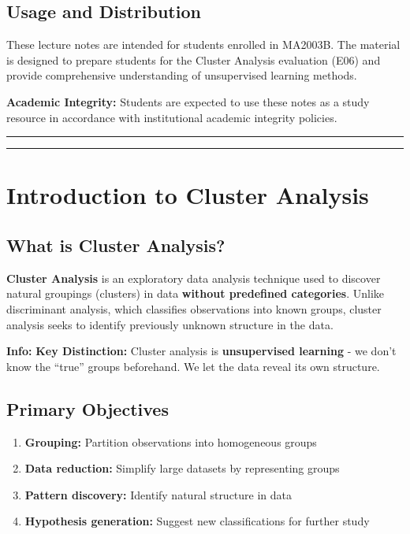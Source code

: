 \documentclass[
]{article}
\begin{document}
\textbf{ }

\subsection{Usage and Distribution}

These lecture notes are intended for students enrolled in MA2003B. The
material is designed to prepare students for the Cluster Analysis
evaluation (E06) and provide comprehensive understanding of unsupervised
learning methods.

\textbf{Academic Integrity:} Students are expected to use these notes as
a study resource in accordance with institutional academic integrity
policies.

\begin{center}\rule{0.5\linewidth}{0.5pt}\end{center}

\begin{center}\rule{0.5\linewidth}{0.5pt}\end{center}

\textbf{ }

\section{Introduction to Cluster Analysis}

\textbf{ }

\subsection{What is Cluster Analysis?}

\textbf{Cluster Analysis} is an exploratory data analysis technique used
to discover natural groupings (clusters) in data \textbf{without
predefined categories}. Unlike discriminant analysis, which classifies
observations into known groups, cluster analysis seeks to identify
previously unknown structure in the data.

\textbf{Info: } \textbf{Key Distinction:} Cluster analysis is
\textbf{unsupervised learning} - we don't know the ``true'' groups
beforehand. We let the data reveal its own structure.

\textbf{ }

\subsection{Primary Objectives}

\begin{enumerate}
\item
  \textbf{Grouping:} Partition observations into homogeneous groups
\item
  \textbf{Data reduction:} Simplify large datasets by representing
  groups
\item
  \textbf{Pattern discovery:} Identify natural structure in data
\item
  \textbf{Hypothesis generation:} Suggest new classifications for
  further study
\end{enumerate}
\end{document}
